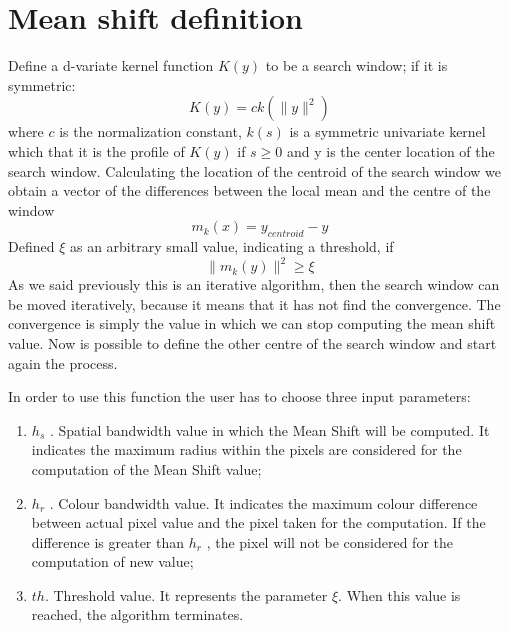 \section{Mean shift definition}
Define a d-variate kernel function $K(y)$ to be a search window; if it is symmetric:
\begin{equation}
K(y)= ck(\|y\|^{2})
\end{equation}
where $c$ is the normalization constant, $k(s)$ is a symmetric univariate kernel which that it is the profile of $K(y)$ if $s \geq 0$ and y is the center location of the search window. Calculating the location of the centroid of the search window we obtain a vector of the differences between the local mean and the centre of the window
\begin{equation}
m_{k}{(x)}= y_{centroid} - y
\end{equation} 
Defined $\xi$ as an arbitrary small value, indicating a threshold, if
\begin{equation}
\|m_{k}(y)\|^2 \geq \xi     
\end{equation}
As we said previously this is an iterative algorithm, then the search window can be moved iteratively, because it means that it has not find the convergence. The convergence is simply the value in which we can stop computing the mean shift value. Now is possible to define the other centre of the search window and start again the process.

\bigskip

In order to use this function the user has to choose three input parameters:
\begin{enumerate}
\item $h_{s}$ . Spatial bandwidth value in which the Mean Shift will be computed. It indicates the maximum radius within the pixels are considered for the computation of the Mean Shift value;

\item $h_{r}$  . Colour bandwidth value. It indicates the maximum colour difference between
actual pixel value and the pixel taken for the computation. If the difference is greater than $h_{r}$ , the pixel will not be considered for the computation of new value;

\item $th$. Threshold value. It represents the parameter $\xi$. When this value is reached, the algorithm terminates.
\end{enumerate}